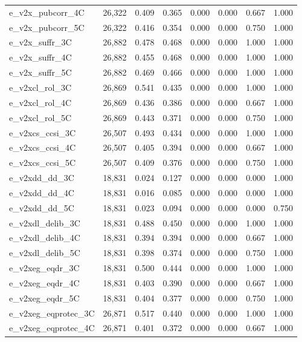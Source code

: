 \begin{table}[!htbp]
\begin{tabular}{@{\extracolsep{5pt}}lccccccc}
e\_v2x\_pubcorr\_4C & 26,322 & 0.409 & 0.365 & 0.000 & 0.000 & 0.667 & 1.000 \\ 
e\_v2x\_pubcorr\_5C & 26,322 & 0.416 & 0.354 & 0.000 & 0.000 & 0.750 & 1.000 \\ 
e\_v2x\_suffr\_3C & 26,882 & 0.478 & 0.468 & 0.000 & 0.000 & 1.000 & 1.000 \\ 
e\_v2x\_suffr\_4C & 26,882 & 0.455 & 0.468 & 0.000 & 0.000 & 1.000 & 1.000 \\ 
e\_v2x\_suffr\_5C & 26,882 & 0.469 & 0.466 & 0.000 & 0.000 & 1.000 & 1.000 \\ 
e\_v2xcl\_rol\_3C & 26,869 & 0.541 & 0.435 & 0.000 & 0.000 & 1.000 & 1.000 \\ 
e\_v2xcl\_rol\_4C & 26,869 & 0.436 & 0.386 & 0.000 & 0.000 & 0.667 & 1.000 \\ 
e\_v2xcl\_rol\_5C & 26,869 & 0.443 & 0.371 & 0.000 & 0.000 & 0.750 & 1.000 \\ 
e\_v2xcs\_ccsi\_3C & 26,507 & 0.493 & 0.434 & 0.000 & 0.000 & 1.000 & 1.000 \\ 
e\_v2xcs\_ccsi\_4C & 26,507 & 0.405 & 0.394 & 0.000 & 0.000 & 0.667 & 1.000 \\ 
e\_v2xcs\_ccsi\_5C & 26,507 & 0.409 & 0.376 & 0.000 & 0.000 & 0.750 & 1.000 \\ 
e\_v2xdd\_dd\_3C & 18,831 & 0.024 & 0.127 & 0.000 & 0.000 & 0.000 & 1.000 \\ 
e\_v2xdd\_dd\_4C & 18,831 & 0.016 & 0.085 & 0.000 & 0.000 & 0.000 & 1.000 \\ 
e\_v2xdd\_dd\_5C & 18,831 & 0.023 & 0.094 & 0.000 & 0.000 & 0.000 & 0.750 \\ 
e\_v2xdl\_delib\_3C & 18,831 & 0.488 & 0.450 & 0.000 & 0.000 & 1.000 & 1.000 \\ 
e\_v2xdl\_delib\_4C & 18,831 & 0.394 & 0.394 & 0.000 & 0.000 & 0.667 & 1.000 \\ 
e\_v2xdl\_delib\_5C & 18,831 & 0.398 & 0.374 & 0.000 & 0.000 & 0.750 & 1.000 \\ 
e\_v2xeg\_eqdr\_3C & 18,831 & 0.500 & 0.444 & 0.000 & 0.000 & 1.000 & 1.000 \\ 
e\_v2xeg\_eqdr\_4C & 18,831 & 0.403 & 0.390 & 0.000 & 0.000 & 0.667 & 1.000 \\ 
e\_v2xeg\_eqdr\_5C & 18,831 & 0.404 & 0.377 & 0.000 & 0.000 & 0.750 & 1.000 \\ 
e\_v2xeg\_eqprotec\_3C & 26,871 & 0.517 & 0.440 & 0.000 & 0.000 & 1.000 & 1.000 \\ 
e\_v2xeg\_eqprotec\_4C & 26,871 & 0.401 & 0.372 & 0.000 & 0.000 & 0.667 & 1.000 \\ 

\end{tabular}
\end{table}
